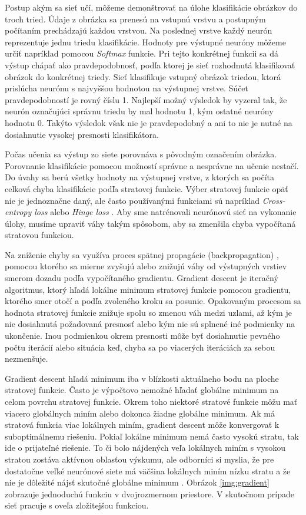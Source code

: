 Postup akým sa sieť učí, môžeme demonštrovať na úlohe klasifikácie obrázkov do troch tried. Údaje z obrázka sa prenesú na vstupnú vrstvu a postupným počítaním prechádzajú každou vrstvou. Na poslednej vrstve každý neurón reprezentuje jednu triedu klasifikácie. Hodnoty pre výstupné neuróny môžeme určiť napríklad pomocou \textit{Softmax} funkcie. Pri tejto konkrétnej funkcii sa dá výstup chápať ako pravdepodobnosť, podľa ktorej je sieť rozhodnutá klasifikovať obrázok do konkrétnej triedy. Sieť klasifikuje vstupný obrázok triedou, ktorá prislúcha neurónu s najvyššou hodnotou na výstupnej vrstve. Súčet pravdepodobností je rovný číslu 1. Najlepší možný výsledok by vyzeral tak, že neurón označujúci správnu triedu by mal hodnotu 1, kým ostatné neuróny hodnotu 0. Takýto výsledok však nie je pravdepodobný a ani to nie je nutné na dosiahnutie vysokej presnosti klasifikátora.

Počas učenia sa výstup zo siete porovnáva s pôvodným označením obrázka. Porovnanie klasifikácie pomocou možností správne a nesprávne na učenie nestačí. Do úvahy sa berú všetky hodnoty na výstupnej vrstve, z ktorých sa počíta celková chyba klasifikácie podľa stratovej funkcie. Výber stratovej funkcie opäť nie je jednoznačne daný, ale často používanými funkciami sú napríklad \textit{Cross-entropy loss} alebo \textit{Hinge loss} \cite{loss}. Aby sme natrénovali neurónovú sieť na vykonanie úlohy, musíme upraviť váhy takým spôsobom, aby sa zmenšila chyba vypočítaná stratovou funkciou.

Na zníženie chyby sa využíva proces spätnej propagácie (backpropagation) \cite{bp}, pomocou ktorého sa mierne zvyšujú alebo znižujú váhy od výstupných vrstiev smerom dozadu podľa vypočítaného gradientu. Gradient descent je iteračný algoritmus, ktorý hľadá lokálne minimum stratovej funkcie pomocou gradientu, ktorého smer otočí a podľa zvoleného kroku sa posunie. Opakovaným procesom sa hodnota stratovej funkcie znižuje spolu so zmenou váh medzi uzlami, až kým je nie dosiahnutá požadovaná presnosť alebo kým nie sú splnené iné podmienky na ukončenie. Inou podmienkou okrem presnosti môže byť dosiahnutie pevného počtu iterácií alebo situácia keď, chyba sa po viacerých iteráciách za sebou nezmenšuje.

Gradient descent hľadá minimum iba v blízkosti aktuálneho bodu na ploche stratovej funkcie. Často je výpočtovo nemožné hľadať globálne minimum na celom povrchu stratovej funkcie. Okrem toho niektoré stratové funkcie môžu mať viacero globálnych miním alebo dokonca žiadne globálne minimum. Ak má stratová funkcia viac lokálnych miním, gradient descent môže konvergovať k suboptimálnemu riešeniu. Pokiaľ lokálne minimum nemá často vysokú stratu, tak ide o prijateľné riešenie. To či bolo nájdených veľa lokálnych miním s vysokou stratou zostáva aktívnou oblasťou výskumu, ale odborníci si myslia, že pre dostatočne veľké neurónové siete má väčšina lokálnych miním nízku stratu a že nie je dôležité nájsť skutočné globálne minimum \cite{Goodfellow-et-al-2016}. Obrázok \ref{img:gradient} zobrazuje jednoduchú funkciu v dvojrozmernom priestore. V skutočnom prípade sieť pracuje s oveľa zložitejšou funkciou.

